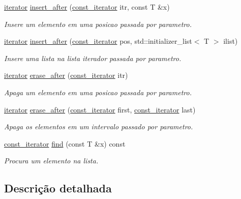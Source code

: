 \begin{DoxyCompactItemize}
\item 
\hyperlink{class_list_1_1iterator}{iterator} \hyperlink{class_list_af5af80234fbd0b47a7fb85b2119e54ba}{insert\+\_\+after} (\hyperlink{class_list_1_1const__iterator}{const\+\_\+iterator} itr, const T \&x)
\begin{DoxyCompactList}\small\item\em Insere um elemento em uma posicao passada por parametro. \end{DoxyCompactList}\item 
\hyperlink{class_list_1_1iterator}{iterator} \hyperlink{class_list_a8d5b3bfe6314a321425b74632fc63ef8}{insert\+\_\+after} (\hyperlink{class_list_1_1const__iterator}{const\+\_\+iterator} pos, std\+::initializer\+\_\+list$<$ T $>$ ilist)
\begin{DoxyCompactList}\small\item\em Insere uma lista na lista iterador passada por parametro. \end{DoxyCompactList}\item 
\hyperlink{class_list_1_1iterator}{iterator} \hyperlink{class_list_a901409fcfd7cb1e04aeaf213fe613a4d}{erase\+\_\+after} (\hyperlink{class_list_1_1const__iterator}{const\+\_\+iterator} itr)
\begin{DoxyCompactList}\small\item\em Apaga um elemento em uma posicao passada por parametro. \end{DoxyCompactList}\item 
\hyperlink{class_list_1_1iterator}{iterator} \hyperlink{class_list_a3e1572fd28739327efe18b41f23c2079}{erase\+\_\+after} (\hyperlink{class_list_1_1const__iterator}{const\+\_\+iterator} first, \hyperlink{class_list_1_1const__iterator}{const\+\_\+iterator} last)
\begin{DoxyCompactList}\small\item\em Apaga os elementos em um intervalo passado por parametro. \end{DoxyCompactList}\item 
\hyperlink{class_list_1_1const__iterator}{const\+\_\+iterator} \hyperlink{class_list_a23e3b812e8ce38d728a036fb7bffc368}{find} (const T \&x) const 
\begin{DoxyCompactList}\small\item\em Procura um elemento na lista. \end{DoxyCompactList}\end{DoxyCompactItemize}


\subsection{Descrição detalhada}
